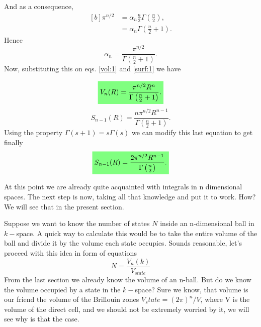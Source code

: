 \begin{questions}
\begin{solution}
\begin{equation}
  \end{equation}
  And as a consequence,
  \begin{equation*}
    \begin{aligned}[b]
      \pi^{n/2} &= \alpha_n \frac{n}{2} \Gamma \left(\frac{n}{2}\right),\\
      & = \alpha_n \Gamma \left(\frac{n}{2} + 1 \right).
    \end{aligned}
  \end{equation*}
  Hence
  \begin{equation}
    \alpha_n = \frac{\pi^{n/2}}{\Gamma \left(\frac{n}{2} + 1 \right)}.
  \end{equation}
  Now, substituting this on eqs. \ref{vol:1} and \ref{surf:1} we have

  \begin{equation}
    \hlgreen{V_n(R) = \frac{\pi^{n/2}R^n}{\Gamma \left(\frac{n}{2} + 1 \right)}.}
  \end{equation}
  \begin{equation*}
    S_{n-1}(R) = \frac{n\pi^{n/2}R^{n-1}}{\Gamma \left(\frac{n}{2} + 1 \right)}.
  \end{equation*}
  Using the property $\Gamma(s+1) = s\Gamma(s)$ we can modify this last equation to get finally
  \begin{equation}
    \hlgreen{S_{n-1}(R) = \frac{2\pi^{n/2}R^{n-1}}{\Gamma \left(\frac{n}{2}\right)}.}
  \end{equation}
 \end{solution}
 \clearpage

 \begin{solution}
   At this point we are already quite acquainted with integrals in n dimensional spaces. The next step is now, taking all that knowledge and put it to work. How? We will see that in the present section.

   Suppose we want to know the number of states $N$ inside an n-dimensional ball in $k-$space. A quick way to calculate this would be to take the entire volume of the ball and divide it by the volume each state occupies. Sounds reasonable, let's proceed with this idea in form of equations
   \begin{equation}
     N = \frac{V_n(k)}{V_{state}}
   \end{equation}
   From the last section we already know the volume of an n-ball. But do we know the volume occupied by a state in the $k-$space? Sure we know, that volume is our friend the volume of the Brillouin zones $V_state = (2\pi)^n/V$, where V is the volume of the direct cell, and we should not be extremely worried by it, we will see why is that the case.


\end{solution}
\end{questions}
